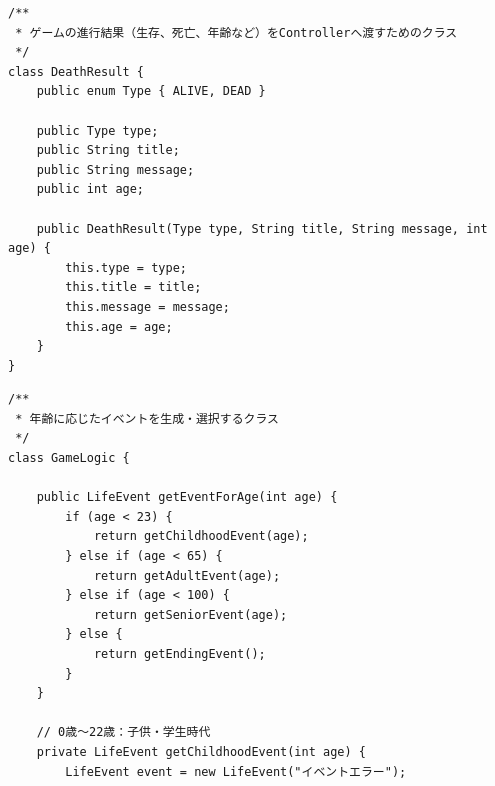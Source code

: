 \documentclass[a4paper,11pt]{jsarticle}
\begin{document}
\begin{lstlisting}[caption=DeathResult.java]
/**
 * ゲームの進行結果（生存、死亡、年齢など）をControllerへ渡すためのクラス
 */
class DeathResult {
    public enum Type { ALIVE, DEAD }
    
    public Type type;
    public String title;
    public String message;
    public int age;

    public DeathResult(Type type, String title, String message, int age) {
        this.type = type;
        this.title = title;
        this.message = message;
        this.age = age;
    }
}
\end{lstlisting}

\begin{lstlisting}[caption=GameLogic.java]
/**
 * 年齢に応じたイベントを生成・選択するクラス
 */
class GameLogic {

    public LifeEvent getEventForAge(int age) {
        if (age < 23) {
            return getChildhoodEvent(age);
        } else if (age < 65) {
            return getAdultEvent(age);
        } else if (age < 100) {
            return getSeniorEvent(age);
        } else {
            return getEndingEvent();
        }
    }

    // 0歳〜22歳：子供・学生時代
    private LifeEvent getChildhoodEvent(int age) {
        LifeEvent event = new LifeEvent("イベントエラー");


\end{lstlisting}
\end{document}
